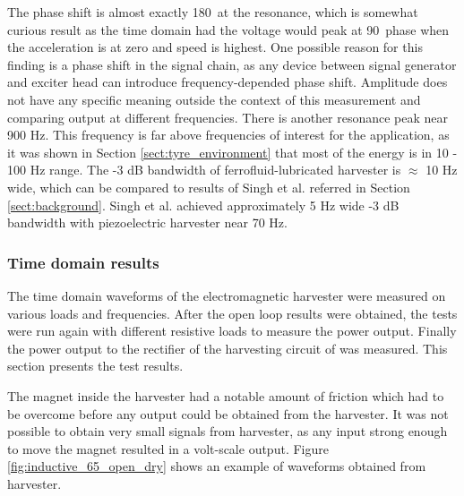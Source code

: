 The phase shift is almost exactly 180\degree \ at the resonance, which is somewhat curious result as the time domain had the voltage would peak at 90\degree \ phase when the acceleration is at zero and speed is highest. One possible reason for this finding is a phase shift in the signal chain, as any device between signal generator and exciter head can introduce frequency-depended phase shift. Amplitude does not have any specific meaning outside the context of this measurement and comparing output at different frequencies.  There is another resonance peak near 900 Hz. This frequency is far above frequencies of interest for the application, as it was shown in Section \ref{sect:tyre_environment} that most of the energy is in 10 - 100 Hz range. The -3 dB bandwidth of ferrofluid-lubricated harvester is $ \approx $ 10 Hz wide, which can be compared to results of Singh et al. \cite{Singh2012} referred in Section \ref{sect:background}. Singh et al. achieved approximately 5 Hz wide -3 dB bandwidth with piezoelectric harvester near 70 Hz.


\subsubsection{Time domain results}\label{sect:lg_td}
The time domain waveforms of the electromagnetic harvester were measured on various loads and frequencies. After the open loop results were obtained, the tests were run again with different resistive loads to measure the power output. Finally the power output to the rectifier of the harvesting circuit of was measured. This section presents the test results. 

The magnet inside the harvester had a notable amount of friction which had to be overcome before any output could be obtained from the harvester. It was not possible to obtain very small signals from harvester, as any input strong enough to move the magnet resulted in a volt-scale output. Figure \ref{fig:inductive_65_open_dry} shows an example of waveforms obtained from harvester. 


